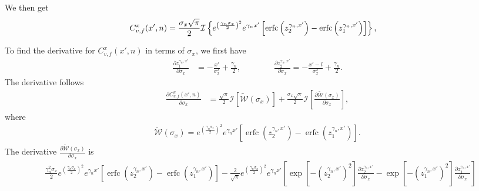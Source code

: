 \documentclass[a4paper,10pt]{article}
\DeclareMathOperator{\erfc}{erfc}
\begin{document}
We then get
\begin{align}
C^x_{v,f}(x',n)&=\frac{\sigma_x\sqrt{\pi}}{2}\mathcal{I}\left\{e^{\left(\frac{\gamma_n\sigma_x}{2}\right)^2}e^{\gamma_nx'}\left[\erfc\left(z_2^{\gamma_n,x'}\right)-\erfc\left(z_1^{\gamma_n,x'}\right)\right]\right\},\notag
\end{align}

To find the derivative for $C^x_{v,f}(x',n)$ in terms of $\sigma_x$, we
first have
\begin{align*}
\frac{\partial z_1^{\gamma_n,x'}}{\partial\sigma_x}&=-\frac{x'}{\sigma^2_x}+\frac{\gamma_n}{2},\qquad\qquad
\frac{\partial z_2^{\gamma_n,x'}}{\partial\sigma_x}=-\frac{x'-l}{\sigma^2_x}+\frac{\gamma_n}{2}.
\end{align*}
The derivative follows
\begin{align}
\frac{\partial C^x_{v,f}(x',n) }{\partial \sigma_x}&=\frac{\sqrt{\pi}}{2}\mathcal{I}\left[\widetilde{\mathcal{W}}(\sigma_x)\right]+
\frac{\sigma_x\sqrt{\pi}}{2}\mathcal{I}\left[\frac{\partial \widetilde{\mathcal{W}}(\sigma_x)}{\partial \sigma_x}\right],
\end{align}
where 
\begin{align*}
\widetilde{\mathcal{W}}(\sigma_x) = e^{\left(\frac{\gamma_n\sigma_x}{2}\right)^2}e^{\gamma_nx'}\left[\erfc\left(z_2^{\gamma_n,x'}\right)-\erfc\left(z_1^{\gamma_n,x'}\right)\right].
\end{align*}
The derivative $\frac{\partial \widetilde{\mathcal{W}}(\sigma_x)}{\partial \sigma_x}$ is
\begin{align*}
&
   \frac{\gamma_n^2\sigma_x}{2} e^{\left(\frac{\gamma_n\sigma_x}{2}\right)^2}e^{\gamma_nx'}\left[\erfc\left(z_2^{\gamma_n,x'}\right)-\erfc\left(z_1^{\gamma_n,x'}\right)\right]
   -\frac{2}{\sqrt{\pi}}
   e^{\left(\frac{\gamma_n\sigma_x}{2}\right)^2}e^{\gamma_nx'}\left[
\exp\left[-\left(z_2^{\gamma_n,x'}\right)^2\right]\frac{\partial z_2^{\gamma_n,x'}}{\partial\sigma_x}- \exp\left[-\left(z_1^{\gamma_n,x'}\right)^2\right]\frac{\partial z_1^{\gamma_n,x'}}{\partial\sigma_x}\right]
\end{align*}









\small{

}
\end{document}
